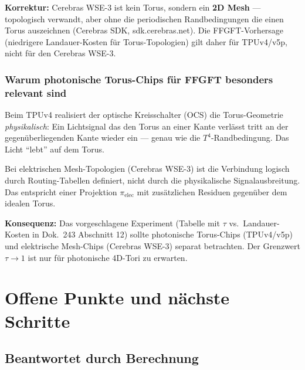 \textbf{Korrektur:}
Cerebras WSE-3 ist kein Torus, sondern ein \textbf{2D Mesh} ---
topologisch verwandt, aber ohne die periodischen Randbedingungen die einen
Torus auszeichnen (Cerebras SDK, sdk.cerebras.net). Die FFGFT-Vorhersage (niedrigere
Landauer-Kosten für Torus-Topologien) gilt daher für TPUv4/v5p,
nicht für den Cerebras WSE-3.

\subsubsection*{Warum photonische Torus-Chips für FFGFT besonders relevant sind}

Beim TPUv4 realisiert der optische Kreisschalter (OCS) die Torus-Geometrie
\emph{physikalisch}: Ein Lichtsignal das den Torus an einer Kante verlässt
tritt an der gegenüberliegenden Kante wieder ein --- genau wie die
$T^4$-Randbedingung. Das Licht ``lebt'' auf dem Torus.

Bei elektrischen Mesh-Topologien (Cerebras WSE-3) ist die Verbindung
logisch durch Routing-Tabellen definiert, nicht durch die physikalische
Signalausbreitung. Das entspricht einer Projektion $\pi_\text{elec}$
mit zusätzlichen Residuen gegenüber dem idealen Torus.

\textbf{Konsequenz:} Das vorgeschlagene Experiment (Tabelle mit $\tau$
vs.\ Landauer-Kosten in Dok.~243 Abschnitt 12) sollte photonische
Torus-Chips (TPUv4/v5p) und elektrische Mesh-Chips (Cerebras WSE-3)
separat betrachten. Der Grenzwert $\tau \to 1$ ist nur für photonische
4D-Tori zu erwarten.


\section{Offene Punkte und nächste Schritte}

\subsection*{Beantwortet durch Berechnung}

